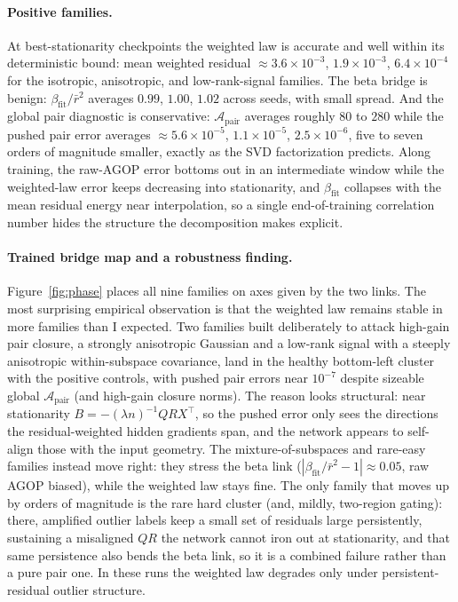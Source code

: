 \documentclass[10pt]{article}
\newcommand{\T}{^{\!\top}}
\newcommand{\pair}{\mathrm{pair}}
\newcommand{\fit}{\mathrm{fit}}
\begin{document}
\paragraph{Positive families.} At best-stationarity checkpoints the weighted law is accurate and well within its deterministic bound: mean weighted residual $\approx 3.6\times10^{-3}$, $1.9\times10^{-3}$, $6.4\times10^{-4}$ for the isotropic, anisotropic, and low-rank-signal families. The beta bridge is benign: $\beta_{\fit}/\bar r^2$ averages $0.99$, $1.00$, $1.02$ across seeds, with small spread. And the global pair diagnostic is conservative: $\mathcal A_{\pair}$ averages roughly $80$ to $280$ while the pushed pair error averages $\approx 5.6\times10^{-5}$, $1.1\times10^{-5}$, $2.5\times10^{-6}$, five to seven orders of magnitude smaller, exactly as the SVD factorization predicts. Along training, the raw-AGOP error bottoms out in an intermediate window while the weighted-law error keeps decreasing into stationarity, and $\beta_{\fit}$ collapses with the mean residual energy near interpolation, so a single end-of-training correlation number hides the structure the decomposition makes explicit.

\paragraph{Trained bridge map and a robustness finding.} Figure~\ref{fig:phase} places all nine families on axes given by the two links. The most surprising empirical observation is that the weighted law remains stable in more families than I expected. Two families built deliberately to attack high-gain pair closure, a strongly anisotropic Gaussian and a low-rank signal with a steeply anisotropic within-subspace covariance, land in the healthy bottom-left cluster with the positive controls, with pushed pair errors near $10^{-7}$ despite sizeable global $\mathcal A_{\pair}$ (and high-gain closure norms). The reason looks structural: near stationarity $B = -(\lambda n)^{-1}QRX\T$, so the pushed error only sees the directions the residual-weighted hidden gradients span, and the network appears to self-align those with the input geometry. The mixture-of-subspaces and rare-easy families instead move right: they stress the beta link ($|\beta_{\fit}/\bar r^2 - 1| \approx 0.05$, raw AGOP biased), while the weighted law stays fine. The only family that moves up by orders of magnitude is the rare hard cluster (and, mildly, two-region gating): there, amplified outlier labels keep a small set of residuals large persistently, sustaining a misaligned $QR$ the network cannot iron out at stationarity, and that same persistence also bends the beta link, so it is a combined failure rather than a pure pair one. In these runs the weighted law degrades only under persistent-residual outlier structure.
\end{document}
